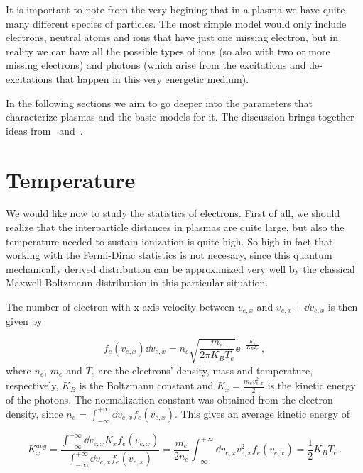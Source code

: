 \documentclass[12pt, class=report, crop=false]{standalone}
\begin{document}
It is important to note from the very begining that in a plasma we have quite many different species of particles. The most simple model would only include electrons, neutral atoms and ions that have just one missing electron, but in reality we can have all the possible types of ions (so also with two or more missing electrons) and photons (which arise from the excitations and de-excitations that happen in this very energetic medium).

In the following sections we aim to go deeper into the parameters that characterize plasmas and the basic models for it. The discussion brings together ideas from~\cite{karschApplicationsHighIntensity2018} and~\cite{mulserHighPowerLasermatter2010}.

\section{Temperature}
We would like now to study the statistics of electrons. First of all, we should realize that the interparticle distances in plasmas are quite large, but also the temperature needed to sustain ionization is quite high. So high in fact that working with the Fermi-Dirac statistics is not necesary, since this quantum mechanically derived distribution can be approximized very well by the classical Maxwell-Boltzmann distribution in this particular situation.

The number of electron with x-axis velocity between \(v_{e,x}\) and \(v_{e,x}+\dd{v_{e,x}}\) is then given by

\begin{equation}
  f_e (v_{e,x}) \dd{v_{e,x}} = n_e \sqrt{\frac{m_e}{2\pi K_B T_e}} \ee^{-\frac{K_x}{K_B T_e}}\,,
\end{equation}
where \(n_e\), \(m_e\) and \(T_e\) are the electrons' density, mass and temperature, respectively, \(K_B\) is the Boltzmann constant and \(K_x = \frac{m_e v_{e,x}^2}{2}\) is the kinetic energy of the photons. The normalization constant was obtained from the electron density, since \(n_e = \int_{-\infty}^{+\infty} \dd{v_{e,x}} f_e (v_{e,x})\). This gives an average kinetic energy of

\begin{equation}
  K_x^{avg} = \frac{\int_{-\infty}^{+\infty} \dd{v_{e,x}} K_x f_e (v_{e,x})}{\int_{-\infty}^{+\infty} \dd{v_{e,x}} f_e (v_{e,x})} = \frac{m_e}{2 n_e} \int_{-\infty}^{+\infty} \dd{v_{e,x}} v_{e,x}^2 f_e (v_{e,x}) = \frac{1}{2} K_B T_e\,.
\end{equation}
\end{document}
